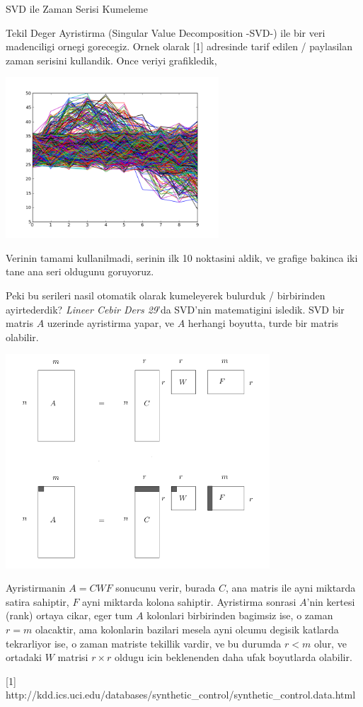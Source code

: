 \documentclass[12pt,fleqn]{article}\usepackage{../common}
\begin{document}
SVD ile Zaman Serisi Kumeleme

Tekil Deger Ayristirma (Singular Value Decomposition -SVD-) ile bir veri
madenciligi ornegi gorecegiz. Ornek olarak [1] adresinde tarif edilen /
paylasilan zaman serisini kullandik. Once veriyi grafikledik,

\includegraphics[height=6cm]{data.png}

Verinin tamami kullanilmadi, serinin ilk 10 noktasini aldik, ve grafige
bakinca iki tane ana seri oldugunu goruyoruz. 



Peki bu serileri nasil otomatik olarak kumeleyerek bulurduk / birbirinden
ayirtederdik?  {\em Lineer Cebir Ders 29}'da SVD'nin matematigini
isledik. SVD bir matris $A$ uzerinde ayristirma yapar, ve $A$ herhangi
boyutta, turde bir matris olabilir.

\includegraphics[height=8cm]{svd1.png}

Ayristirmanin $A=CWF$ sonucunu verir, burada $C$, ana matris ile ayni
miktarda satira sahiptir, $F$ ayni miktarda kolona sahiptir. Ayristirma
sonrasi $A$'nin kertesi (rank) ortaya cikar, eger tum $A$ kolonlari
birbirinden bagimsiz ise, o zaman $r=m$ olacaktir, ama kolonlarin bazilari
mesela ayni olcumu degisik katlarda tekrarliyor ise, o zaman matriste
tekillik vardir, ve bu durumda $r < m$ olur, ve ortadaki $W$ matrisi $r
\times r$ 
oldugu icin beklenenden daha ufak boyutlarda olabilir. 

[1] http://kdd.ics.uci.edu/databases/synthetic\_control/synthetic\_control.data.html
\end{document}
